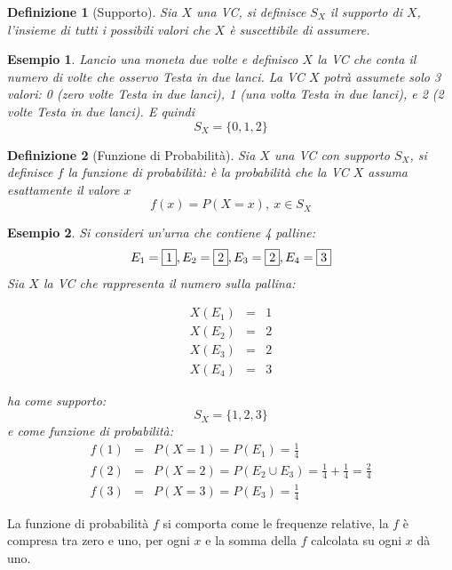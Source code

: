 \documentclass[
  11pt,
]{book}
\theoremstyle{mytheoremstyle}
\theoremstyle{mydefstyle}
\newtheorem{definition}{Definizione}[section]
\newtheorem{example}{{Esempio}}[section]
\begin{document}
\begin{info}

\begin{definition}[Supporto]
Sia \(X\) una VC, si definisce \(S_X\) il supporto di \(X\), l'insieme di tutti i possibili valori che \(X\) è suscettibile di assumere.
\end{definition}

\end{info}

\begin{example}
Lancio una moneta due volte e definisco \(X\) la VC che \emph{conta il numero di volte che osservo Testa in due lanci}. La VC \(X\)
potrà assumete solo 3 valori: 0 (zero volte Testa in due lanci), 1 (una volta Testa in due lanci), e 2 (2 volte Testa in due lanci). E quindi
\[
S_X=\{0,1,2\}
\]
\end{example}

\begin{info}

\begin{definition}[Funzione di Probabilità]
Sia \(X\) una VC con supporto \(S_X\), si definisce \(f\) la funzione di probabilità:
è la probabilità che la VC \(X\) assuma esattamente il valore \(x\)
\[
f(x)=P(X=x), ~x\in S_X
\]
\end{definition}

\end{info}

\begin{example}
Si consideri un'urna che contiene 4 palline: \[E_1=\fbox{1},E_2=\fbox{2},E_3=\fbox{2},E_4=\fbox{3}\] Sia \(X\) la VC che rappresenta il numero sulla pallina:

\begin{eqnarray*}
X(E_1) &=& 1\\
X(E_2) &=& 2\\
X(E_3) &=& 2\\
X(E_4) &=& 3
\end{eqnarray*}

ha come supporto: \[S_X = \{1,2,3\}\] e come funzione di probabilità:
\begin{eqnarray*}
f(1)&=&P(X=1)=P(E_1)=\frac 1 4\\
f(2)&=&P(X=2)=P(E_2\cup E_3)=\frac 1 4+\frac 1 4=\frac 2 4\\
f(3)&=&P(X=3)=P(E_3)=\frac 1 4
\end{eqnarray*}
\end{example}

La funzione di probabilità \(f\) si comporta come le frequenze relative,
la \(f\) è compresa tra zero e uno, per ogni \(x\) e
la somma della \(f\) calcolata su ogni \(x\) dà uno.
\end{document}
